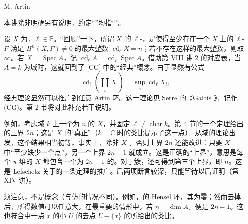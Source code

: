 \begin{center}M. Artin\end{center}
本讲除非明确另有说明，约定“”均指“”。

设 $X$ 为，$\ell\in\mathbb P$。“回顾”一下，所谓 $X$ 的 $\ell$-，是使得至少存在一个 $X$ 上的 $\ell$- $F$ 满足 $H^n(X,F)\ne0$ 的最大整数 $\operatorname{cd}_\ell X=n$；若不存在这样的最大整数，则取 $\infty$。若 $X=\operatorname{Spec}A$，记 $\operatorname{cd}_\ell A=\operatorname{cd}_\ell\operatorname{Spec}A$。借助第 VIII 讲 2 的对应表，当 $A=k$ 为域时，这就回到了 [CG] 中的“经典”概念。由于显然有公式
\[
 \operatorname{cd}_\ell\left(\coprod_iX_i\right)=\sup_i\operatorname{cd}_\ell X_i,
\]
经典理论显然可以推广到任意 Artin 环。这一理论见 Serre 的《Galois 》，记作 (CG)。第 2 节将对此补充若干说明。

例如，考虑域 $k$ 上一个为 $n$ 的 $X$，并固定 $\ell\ne\operatorname{char}k$。第 4 节的一个定理给出的上界 $2n$；这是 $X$ 的“真正”（$k=\mathbb C$ 时的类比提示了这一点）。从域的理论出发，这个结果相当初等。事实上，除非 $X$ ，否则上界 $2n$ 还能改进：只要 $X$ 中“至少缺少一个点”，另一个上界 $2n-1$ 就成立。这是正确的“上界”，意思是每个 $n$ 维的 $X$ 都包含一个为 $2n-1$ 的。对于簇，还可得到第三个上界，即 $n$。这是 Lefschetz 关于的一条定理的推广。后两项断言较深，只能留待以后证明（第 XIV 讲）。

须注意，不是概念（与仿的情况不同）。例如，的 Hensel 环，其为零；然而去掉后，所得数值可以任意大，在最重要的情形中，若 $n=\dim A$，便是 $2n-1$。这也符合中一点 $x$ 的小 $U$ 的去点 $U-\{x\}$ 的所给出的类比。

